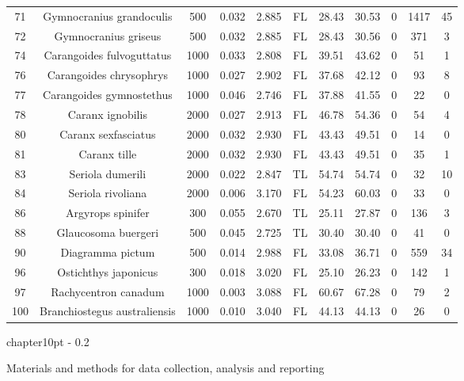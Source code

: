\documentclass{report}\usepackage[]{graphicx}\usepackage[]{color}
\makeatletter
\renewcommand\chapter{\@startsection%
{chapter}{1}{0pt}%
{-\baselineskip}%
{0.2\baselineskip}%
{\raggedright\bf}}%
\makeatother
\begin{document}
\begin{table}[ht]
{\begin{tabular}{ccccccccccc}
  71 & Gymnocranius grandoculis & 500 & 0.032 & 2.885 & FL & 28.43 & 30.53 & 0 & 1417 & 45 \\ 
  72 & Gymnocranius griseus & 500 & 0.032 & 2.885 & FL & 28.43 & 30.56 & 0 & 371 & 3 \\ 
  74 & Carangoides fulvoguttatus & 1000 & 0.033 & 2.808 & FL & 39.51 & 43.62 & 0 & 51 & 1 \\ 
  76 & Carangoides chrysophrys & 1000 & 0.027 & 2.902 & FL & 37.68 & 42.12 & 0 & 93 & 8 \\ 
  77 & Carangoides gymnostethus & 1000 & 0.046 & 2.746 & FL & 37.88 & 41.55 & 0 & 22 & 0 \\ 
  78 & Caranx ignobilis & 2000 & 0.027 & 2.913 & FL & 46.78 & 54.36 & 0 & 54 & 4 \\ 
  80 & Caranx sexfasciatus & 2000 & 0.032 & 2.930 & FL & 43.43 & 49.51 & 0 & 14 & 0 \\ 
  81 & Caranx tille & 2000 & 0.032 & 2.930 & FL & 43.43 & 49.51 & 0 & 35 & 1 \\ 
  83 & Seriola dumerili & 2000 & 0.022 & 2.847 & TL & 54.74 & 54.74 & 0 & 32 & 10 \\ 
  84 & Seriola rivoliana & 2000 & 0.006 & 3.170 & FL & 54.23 & 60.03 & 0 & 33 & 0 \\ 
  86 & Argyrops spinifer & 300 & 0.055 & 2.670 & TL & 25.11 & 27.87 & 0 & 136 & 3 \\ 
  88 & Glaucosoma buergeri & 500 & 0.045 & 2.725 & TL & 30.40 & 30.40 & 0 & 41 & 0 \\ 
  90 & Diagramma pictum & 500 & 0.014 & 2.988 & FL & 33.08 & 36.71 & 0 & 559 & 34 \\ 
  96 & Ostichthys japonicus & 300 & 0.018 & 3.020 & FL & 25.10 & 26.23 & 0 & 142 & 1 \\ 
  97 & Rachycentron canadum & 1000 & 0.003 & 3.088 & FL & 60.67 & 67.28 & 0 & 79 & 2 \\ 
  100 & Branchiostegus australiensis & 1000 & 0.010 & 3.040 & FL & 44.13 & 44.13 & 0 & 26 & 0 \\ 
   \hline
\end{tabular}
}
\end{table}


\clearpage
\newpage

\chapter{Materials and methods for data collection, analysis and reporting}

\end{document}

